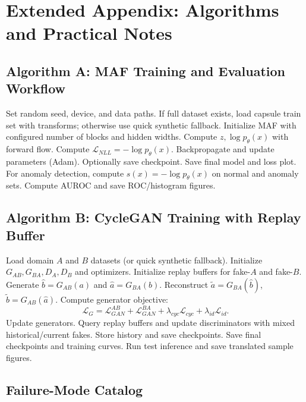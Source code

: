 \documentclass[conference]{IEEEtran}
\begin{document}
\section{Extended Appendix: Algorithms and Practical Notes}
\subsection{Algorithm A: MAF Training and Evaluation Workflow}
\begin{algorithmic}[1]
\STATE Set random seed, device, and data paths.
\STATE If full dataset exists, load capsule train set with transforms; otherwise use quick synthetic fallback.
\STATE Initialize MAF with configured number of blocks and hidden widths.
    \STATE Compute $z,\log p_\theta(x)$ with forward flow.
    \STATE Compute $\mathcal{L}_{NLL}=-\log p_\theta(x)$.
    \STATE Backpropagate and update parameters (Adam).
  \ENDFOR
  \STATE Optionally save checkpoint.
\ENDFOR
\STATE Save final model and loss plot.
\STATE For anomaly detection, compute $s(x)=-\log p_\theta(x)$ on normal and anomaly sets.
\STATE Compute AUROC and save ROC/histogram figures.
\end{algorithmic}

\subsection{Algorithm B: CycleGAN Training with Replay Buffer}
\begin{algorithmic}[1]
\STATE Load domain $A$ and $B$ datasets (or quick synthetic fallback).
\STATE Initialize $G_{AB}, G_{BA}, D_A, D_B$ and optimizers.
\STATE Initialize replay buffers for fake-$A$ and fake-$B$.
    \STATE Generate $\hat{b}=G_{AB}(a)$ and $\hat{a}=G_{BA}(b)$.
    \STATE Reconstruct $\tilde{a}=G_{BA}(\hat{b})$, $\tilde{b}=G_{AB}(\hat{a})$.
    \STATE Compute generator objective:
    \[
      \mathcal{L}_G=\mathcal{L}_{GAN}^{AB}+\mathcal{L}_{GAN}^{BA}+\lambda_{cyc}\mathcal{L}_{cyc}+\lambda_{id}\mathcal{L}_{id}.
    \]
    \STATE Update generators.
    \STATE Query replay buffers and update discriminators with mixed historical/current fakes.
  \ENDFOR
  \STATE Store history and save checkpoints.
\ENDFOR
\STATE Save final checkpoints and training curves.
\STATE Run test inference and save translated sample figures.
\end{algorithmic}

\subsection{Failure-Mode Catalog}
\end{document}
